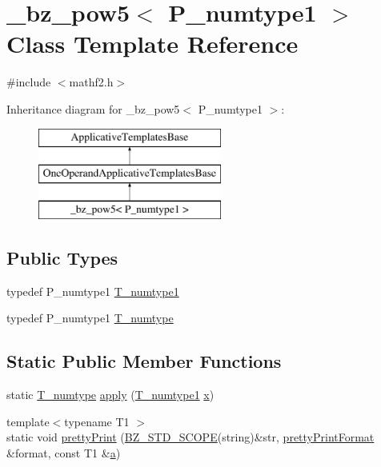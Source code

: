 \hypertarget{class__bz__pow5}{}\section{\+\_\+bz\+\_\+pow5$<$ P\+\_\+numtype1 $>$ Class Template Reference}
\label{class__bz__pow5}


{\ttfamily \#include $<$mathf2.\+h$>$}

Inheritance diagram for \+\_\+bz\+\_\+pow5$<$ P\+\_\+numtype1 $>$\+:\begin{figure}[H]
\begin{center}
\leavevmode
\includegraphics[height=3.000000cm]{class__bz__pow5}
\end{center}
\end{figure}
\subsection*{Public Types}
\begin{DoxyCompactItemize}
\item 
typedef P\+\_\+numtype1 \hyperlink{class__bz__pow5_ad5ebeb43252352b3ec3933a72e937d7d}{T\+\_\+numtype1}
\item 
typedef P\+\_\+numtype1 \hyperlink{class__bz__pow5_a577ea60b29741abe148fa8df0b546cf7}{T\+\_\+numtype}
\end{DoxyCompactItemize}
\subsection*{Static Public Member Functions}
\begin{DoxyCompactItemize}
\item 
static \hyperlink{class__bz__pow5_a577ea60b29741abe148fa8df0b546cf7}{T\+\_\+numtype} \hyperlink{class__bz__pow5_a3f29d78f21bdeb52bec1ecc7af90534d}{apply} (\hyperlink{class__bz__pow5_ad5ebeb43252352b3ec3933a72e937d7d}{T\+\_\+numtype1} \hyperlink{vecnorm1_8cc_ac73eed9e41ec09d58f112f06c2d6cb63}{x})
\item 
{\footnotesize template$<$typename T1 $>$ }\\static void \hyperlink{class__bz__pow5_a44be760493205ed5a9564d261422586f}{pretty\+Print} (\hyperlink{numinquire_8h_a2b24ffc3b4ef9803956bc7715c6c7b83}{B\+Z\+\_\+\+S\+T\+D\+\_\+\+S\+C\+O\+P\+E}(string)\&str, \hyperlink{classprettyPrintFormat}{pretty\+Print\+Format} \&format, const T1 \&\hyperlink{gen__mat5files_8m_aae328bf20413f220e38aec4d95bfd6da}{a})
\end{DoxyCompactItemize}


